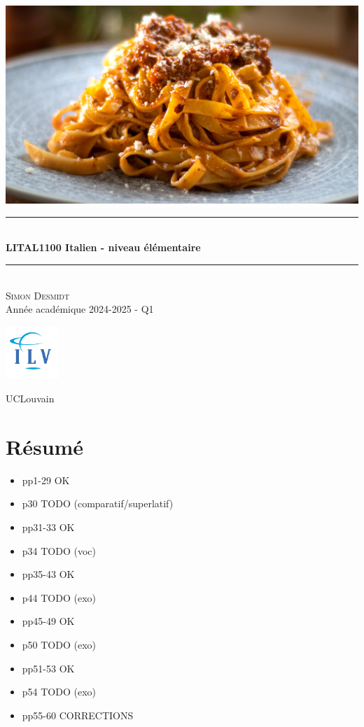 \documentclass[12pt, openany]{report}
\newcommand{\HRule}{\rule{\linewidth}{0.5mm}}
\begin{document}
\begin{titlepage}
    \begin{sffamily}
    \begin{center}
        \includegraphics[scale=0.25]{img/page_de_garde.png} \\[1cm]
        \HRule \\[0.4cm]
        { \huge \bfseries LITAL1100 Italien - niveau élémentaire \\[0.4cm] }
    
        \HRule \\[1.5cm]
        \textsc{\LARGE Simon Desmidt}\\[1cm]
        \vfill
        \vspace{2cm}
        {\large Année académique 2024-2025 - Q1}
        \vspace{0.4cm}
         
        \includegraphics[width=0.15\textwidth]{img/ilv.png}
        
        UCLouvain\\
    
    \end{center}
    \end{sffamily}
\end{titlepage}

\setcounter{tocdepth}{1}
\tableofcontents
\chapter{Résumé}
\begin{itemize}
    \item pp1-29 OK
    \item p30 TODO (comparatif/superlatif)
    \item pp31-33 OK
    \item p34 TODO (voc)
    \item pp35-43 OK 
    \item p44 TODO (exo)
    \item pp45-49 OK
    \item p50 TODO (exo)
    \item pp51-53 OK
    \item p54 TODO (exo)
    \item pp55-60 CORRECTIONS
\end{itemize}
\end{document}
